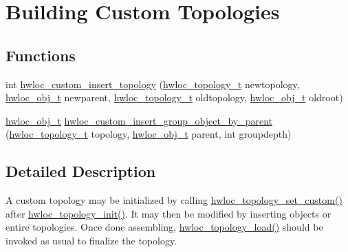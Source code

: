 \hypertarget{a00051}{
\section{Building Custom Topologies}
\label{a00051}
}
\subsection*{Functions}
\begin{DoxyCompactItemize}
\item 
 int \hyperlink{a00051_ga59ccf6a63cb23d63940e8b782059d9cb}{hwloc\_\-custom\_\-insert\_\-topology} (\hyperlink{a00039_ga9d1e76ee15a7dee158b786c30b6a6e38}{hwloc\_\-topology\_\-t} newtopology, \hyperlink{a00016}{hwloc\_\-obj\_\-t} newparent, \hyperlink{a00039_ga9d1e76ee15a7dee158b786c30b6a6e38}{hwloc\_\-topology\_\-t} oldtopology, \hyperlink{a00016}{hwloc\_\-obj\_\-t} oldroot)
\item 
 \hyperlink{a00016}{hwloc\_\-obj\_\-t} \hyperlink{a00051_gac1037fe389bfa7c2bf0e3739b7e20844}{hwloc\_\-custom\_\-insert\_\-group\_\-object\_\-by\_\-parent} (\hyperlink{a00039_ga9d1e76ee15a7dee158b786c30b6a6e38}{hwloc\_\-topology\_\-t} topology, \hyperlink{a00016}{hwloc\_\-obj\_\-t} parent, int groupdepth)
\end{DoxyCompactItemize}


\subsection{Detailed Description}
A custom topology may be initialized by calling \hyperlink{a00044_ga12024fec46f9368fb8fc5c624089c5ec}{hwloc\_\-topology\_\-set\_\-custom()} after \hyperlink{a00043_ga5c2d6f476af87005c7bd0811d4548b9f}{hwloc\_\-topology\_\-init()}. It may then be modified by inserting objects or entire topologies. Once done assembling, \hyperlink{a00043_ga91e2e6427b95fb7339c99dbbef996e71}{hwloc\_\-topology\_\-load()} should be invoked as usual to finalize the topology. 

